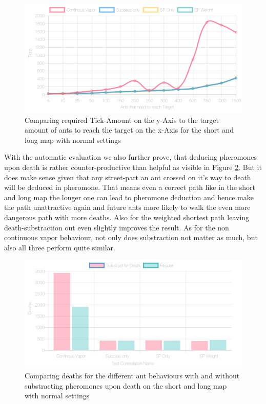 \begin{figure}[H]
  \centering
  \includegraphics[width=1\linewidth]{images/normalshortandlongwithtowers-ticks-line}
  \caption{Comparing required Tick-Amount on the y-Axis to the target amount of ants to reach the target on the x-Axis for the short and long map with normal settings}
  \label{fig:shortlongvaptick}
\end{figure}

With the automatic evaluation we also further prove, that deducing pheromones upon death is rather counter-productive than helpful as visible in Figure \ref{fig:deathsubshitty}. But it does make sense given that any street-part an ant crossed on it's way to death will be deduced in pheromone. That means even a correct path like in the short and long map the longer one can lead to pheromone deduction and hence make the path unattractive again and future ants more likely to walk the even more dangerous path with more deaths.
Also for the weighted shortest path leaving death-substraction out even slightly improves the result. As for the non continuous vapor behaviour, not only does substraction not matter as much, but also all three perform quite similar.


\begin{figure}[H]
  \centering
  \includegraphics[width=1\linewidth]{images/normalshortandlongwithtowers-deaths}
  \caption{Comparing deaths for the different ant behaviours with and without substracting pheromones upon death on the short and long map with normal settings}
  \label{fig:deathsubshitty}
\end{figure}

